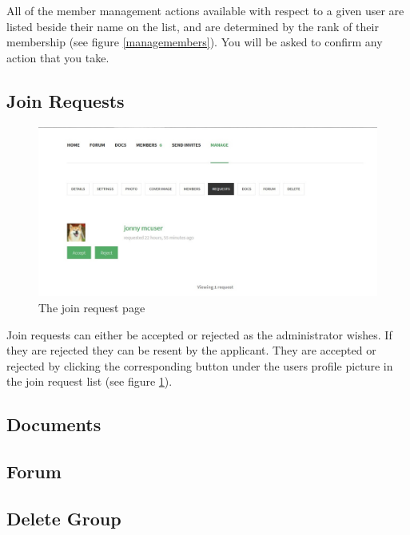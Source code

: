 \documentclass[10pt]{article}
\begin{document}
\begin{flushleft}

All of the member management actions available with respect to a given user are listed beside their name on the list, and are determined by the rank of their membership (see figure \ref{managemembers}).  You will be asked to confirm any action that you take. 

\end{flushleft}

\subsection{Join Requests}


\begin{figure}[H]
    \centering
    \includegraphics[scale=0.5]{images/memrequest.jpg}
    \caption{The join request page}
    \label{memrequest}
\end{figure}

\begin{flushleft}
Join requests can either be accepted or rejected as the administrator wishes.  If they are rejected they can be resent by the applicant.  They are accepted or rejected by clicking the corresponding button under the users profile picture in the join request list (see figure \ref{memrequest}).
\end{flushleft}


\subsection{Documents}
\subsection{Forum}
\subsection{Delete Group}
\end{document}
